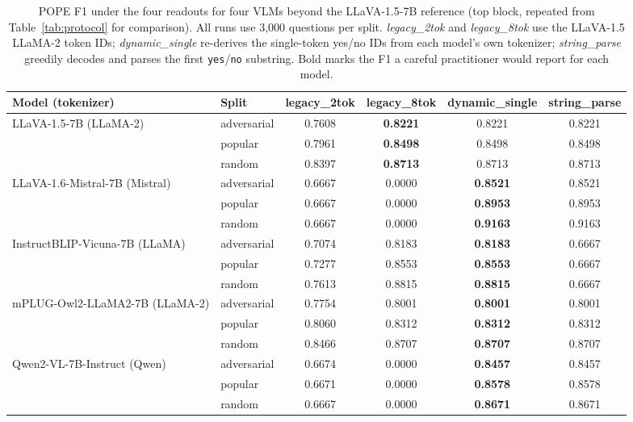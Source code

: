 \documentclass[11pt,letterpaper]{article}
\begin{document}
\begin{table}[t]
\caption{POPE F1 under the four readouts for four VLMs beyond the
LLaVA-1.5-7B reference (top block, repeated from
Table~\ref{tab:protocol} for comparison). All runs use 3{,}000
questions per split. \emph{legacy\_2tok} and \emph{legacy\_8tok} use
the LLaVA-1.5 LLaMA-2 token IDs; \emph{dynamic\_single} re-derives the
single-token yes/no IDs from each model's own tokenizer;
\emph{string\_parse} greedily decodes and parses the first
\texttt{yes}/\texttt{no} substring. Bold marks the F1 a careful
practitioner would report for each model.}
\label{tab:multimodel}
\centering
\small
\begin{tabular}{llcccc}
\toprule
Model (tokenizer) & Split & legacy\_2tok & legacy\_8tok & dynamic\_single & string\_parse \\
\midrule
\multirow{3}{*}{LLaVA-1.5-7B (LLaMA-2)}
 & adversarial & 0.7608 & \textbf{0.8221} & 0.8221 & 0.8221 \\
 & popular     & 0.7961 & \textbf{0.8498} & 0.8498 & 0.8498 \\
 & random      & 0.8397 & \textbf{0.8713} & 0.8713 & 0.8713 \\
\midrule
\multirow{3}{*}{LLaVA-1.6-Mistral-7B (Mistral)}
 & adversarial & 0.6667 & 0.0000 & \textbf{0.8521} & 0.8521 \\
 & popular     & 0.6667 & 0.0000 & \textbf{0.8953} & 0.8953 \\
 & random      & 0.6667 & 0.0000 & \textbf{0.9163} & 0.9163 \\
\midrule
\multirow{3}{*}{InstructBLIP-Vicuna-7B (LLaMA)}
 & adversarial & 0.7074 & 0.8183 & \textbf{0.8183} & 0.6667 \\
 & popular     & 0.7277 & 0.8553 & \textbf{0.8553} & 0.6667 \\
 & random      & 0.7613 & 0.8815 & \textbf{0.8815} & 0.6667 \\
\midrule
\multirow{3}{*}{mPLUG-Owl2-LLaMA2-7B (LLaMA-2)}
 & adversarial & 0.7754 & 0.8001 & \textbf{0.8001} & 0.8001 \\
 & popular     & 0.8060 & 0.8312 & \textbf{0.8312} & 0.8312 \\
 & random      & 0.8466 & 0.8707 & \textbf{0.8707} & 0.8707 \\
\midrule
\multirow{3}{*}{Qwen2-VL-7B-Instruct (Qwen)}
 & adversarial & 0.6674 & 0.0000 & \textbf{0.8457} & 0.8457 \\
 & popular     & 0.6671 & 0.0000 & \textbf{0.8578} & 0.8578 \\
 & random      & 0.6667 & 0.0000 & \textbf{0.8671} & 0.8671 \\
\bottomrule
\end{tabular}
\end{table}
\end{document}
